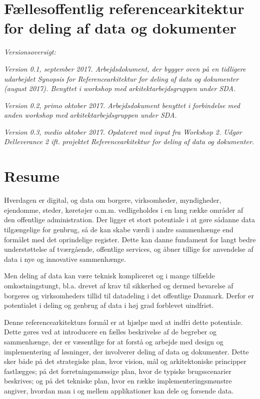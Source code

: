 \section{Fællesoffentlig referencearkitektur for deling af data og
dokumenter}\label{fuxe6llesoffentlig-referencearkitektur-for-deling-af-data-og-dokumenter}

\emph{Versionsoversigt:}

\emph{Version 0.1, september 2017. Arbejdsdokument, der bygger oven på
en tidligere udarbejdet Synopsis for Referencearkitektur for deling af
data og dokumenter (august 2017). Benyttet i workshop med
arkitektarbejdsgruppen under SDA.}

\emph{Version 0.2, primo oktober 2017. Arbejdsdokument benyttet i
forbindelse med anden workshop med arkitektarbejdsgruppen under SDA.}

\emph{Version 0.3, medio oktober 2017. Opdateret med input fra Workshop
2. Udgør Delleverance 2 ift. projektet Referencearkitektur for deling af
data og dokumenter.}

\section{Resume}\label{resume}

Hverdagen er digital, og data om borgere, virksomheder, myndigheder,
ejendomme, steder, køretøjer o.m.m. vedligeholdes i en lang række
områder af den offentlige administration. Der ligger et stort potentiale
i at gøre sådanne data tilgængelige for genbrug, så de kan skabe værdi i
andre sammenhænge end formålet med det oprindelige register. Dette kan
danne fundament for langt bedre understøttelse af tværgående, offentlige
services, og åbner tillige for anvendelse af data i nye og innovative
sammenhænge.

Men deling af data kan være teknisk kompliceret og i mange tilfælde
omkostningstungt, bl.a. drevet af krav til sikkerhed og dermed bevarelse
af borgeres og virksomheders tillid til datadeling i det offentlige
Danmark. Derfor er potentialet i deling og genbrug af data i høj grad
forblevet uindfriet.

Denne referencearkitekturs formål er at hjælpe med at indfri dette
potentiale. Dette gøres ved at introducere en fælles beskrivelse af de
begreber og sammenhænge, der er væsentlige for at forstå og arbejde med
design og implementering af løsninger, der involverer deling af data og
dokumenter. Dette sker både på det strategiske plan, hvor vision, mål og
arkitektoniske principper fastlægges; på det forretningsmæssige plan,
hvor de typiske brugsscenarier beskrives; og på det tekniske plan, hvor
en række implementeringsmønstre angiver, hvordan man i og mellem
applikationer kan dele og forsende data.

